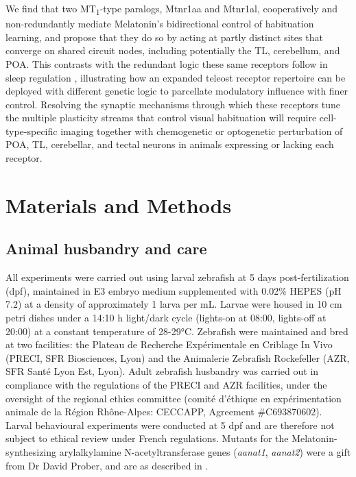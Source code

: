 \documentclass[9.5pt]{RandlettLab_elife}            %
\begin{document}
We find that two MT\textsubscript{1}-type paralogs, Mtnr1aa and Mtnr1al, cooperatively and non-redundantly mediate Melatonin's bidirectional control of habituation learning, and propose that they do so by acting at partly distinct sites that converge on shared circuit nodes, including potentially the TL, cerebellum, and POA.
This contrasts with the redundant logic these same receptors follow in sleep regulation \citep{Hill2026}, illustrating how an expanded teleost receptor repertoire can be deployed with different genetic logic to parcellate modulatory influence with finer control.
Resolving the synaptic mechanisms through which these receptors tune the multiple plasticity streams that control visual habituation will require cell-type-specific imaging together with chemogenetic or optogenetic perturbation of POA, TL, cerebellar, and tectal neurons in animals expressing or lacking each receptor.


\section{Materials and Methods}

\subsection{Animal husbandry and care}
All experiments were carried out using larval zebrafish at 5 days post-fertilization (dpf), maintained in E3 embryo medium supplemented with 0.02\% HEPES (pH 7.2) at a density of approximately 1 larva per mL.
Larvae were housed in 10 cm petri dishes under a 14:10 h light/dark cycle (lights-on at 08:00, lights-off at 20:00) at a constant temperature of 28-29°C.
Zebrafish were maintained and bred at two facilities: the Plateau de Recherche Expérimentale en Criblage In Vivo (PRECI, SFR Biosciences, Lyon) and the Animalerie Zebrafish Rockefeller (AZR, SFR Santé Lyon Est, Lyon).
Adult zebrafish husbandry was carried out in compliance with the regulations of the PRECI and AZR facilities, under the oversight of the regional ethics committee (comité d'éthique en expérimentation animale de la Région Rhône-Alpes: CECCAPP, Agreement \#C693870602).
Larval behavioural experiments were conducted at 5 dpf and are therefore not subject to ethical review under French regulations.
Mutants for the Melatonin-synthesizing arylalkylamine N-acetyltransferase genes (\emph{aanat1}, \emph{aanat2}) were a gift from Dr David Prober, and are as described in \citet{Gandhi2015_NEURON}.
\end{document}
